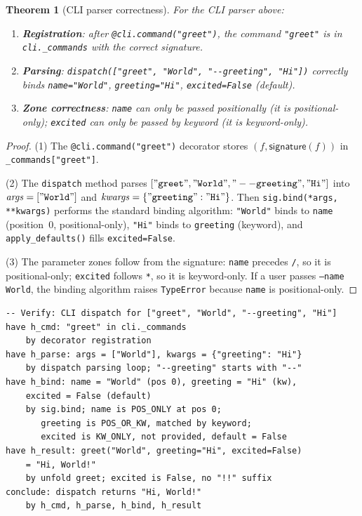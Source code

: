 \documentclass[11pt,a4paper]{report}
\theoremstyle{definition}
\theoremstyle{plain}
\newtheorem{theorem}[definition]{Theorem}
\begin{document}
\begin{theorem}[CLI parser correctness]
\label{thm:cli-parser}
For the CLI parser above:
\begin{enumerate}
  \item \textbf{Registration}: after \lstinline[style=python]{@cli.command("greet")},
    the command \texttt{"greet"} is in \lstinline[style=python]{cli._commands}
    with the correct signature.
  \item \textbf{Parsing}: \lstinline[style=python]{dispatch(["greet", "World", "--greeting", "Hi"])}
    correctly binds \texttt{name="World"}, \texttt{greeting="Hi"},
    \texttt{excited=False} (default).
  \item \textbf{Zone correctness}: \texttt{name} can only be passed
    positionally (it is positional-only); \texttt{excited} can only be
    passed by keyword (it is keyword-only).
\end{enumerate}
\end{theorem}
\begin{proof}
(1) The \lstinline[style=python]{@cli.command("greet")} decorator stores
$(f, \mathsf{signature}(f))$ in \lstinline[style=python]{_commands["greet"]}.

(2) The \lstinline[style=python]{dispatch} method parses
$[\mathtt{"greet"}, \mathtt{"World"}, \mathtt{"--greeting"}, \mathtt{"Hi"}]$
into $\mathit{args} = [\mathtt{"World"}]$ and
$\mathit{kwargs} = \{\mathtt{"greeting"}: \mathtt{"Hi"}\}$.
Then \lstinline[style=python]{sig.bind(*args, **kwargs)} performs the
standard binding algorithm:
\texttt{"World"} binds to \texttt{name} (position~0, positional-only),
\texttt{"Hi"} binds to \texttt{greeting} (keyword), and
\lstinline[style=python]{apply_defaults()} fills \texttt{excited=False}.

(3) The parameter zones follow from the signature:
\texttt{name} precedes \texttt{/}, so it is positional-only;
\texttt{excited} follows \texttt{*}, so it is keyword-only.
If a user passes \texttt{--name World}, the binding algorithm raises
\lstinline[style=python]{TypeError} because \texttt{name} is positional-only.
\end{proof}

\begin{lstlisting}[style=proof]
-- Verify: CLI dispatch for ["greet", "World", "--greeting", "Hi"]
have h_cmd: "greet" in cli._commands
    by decorator registration
have h_parse: args = ["World"], kwargs = {"greeting": "Hi"}
    by dispatch parsing loop; "--greeting" starts with "--"
have h_bind: name = "World" (pos 0), greeting = "Hi" (kw),
    excited = False (default)
    by sig.bind; name is POS_ONLY at pos 0;
       greeting is POS_OR_KW, matched by keyword;
       excited is KW_ONLY, not provided, default = False
have h_result: greet("World", greeting="Hi", excited=False)
    = "Hi, World!"
    by unfold greet; excited is False, no "!!" suffix
conclude: dispatch returns "Hi, World!"
    by h_cmd, h_parse, h_bind, h_result
\end{lstlisting}
\end{document}

